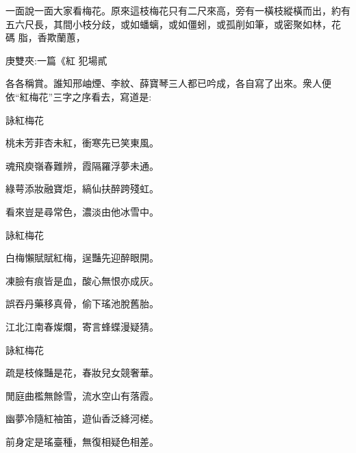 \begin{parag}
    一面說一面大家看梅花。原來這枝梅花只有二尺來高，旁有一橫枝縱橫而出，約有五六尺長，其間小枝分歧，或如蟠螭，或如僵蚓，或孤削如筆，或密聚如林，花 碼 脂，香欺蘭蕙，\begin{note}庚雙夾:一篇《紅 犯場貳\end{note}各各稱賞。誰知邢岫煙、李紋、薛寶琴三人都已吟成，各自寫了出來。衆人便依“紅梅花”三字之序看去，寫道是:
\end{parag}


\begin{poem}
    \begin{pl}詠紅梅花\end{pl}

    \begin{pl}桃未芳菲杏未紅，衝寒先已笑東風。\end{pl}

    \begin{pl}魂飛庾嶺春難辨，霞隔羅浮夢未通。\end{pl}

    \begin{pl}綠萼添妝融寶炬，縞仙扶醉跨殘虹。\end{pl}

    \begin{pl}看來豈是尋常色，濃淡由他冰雪中。\end{pl}
    \emptypl

    \begin{pl}詠紅梅花\end{pl}

    \begin{pl}白梅懶賦賦紅梅，逞豔先迎醉眼開。\end{pl}

    \begin{pl}凍臉有痕皆是血，酸心無恨亦成灰。\end{pl}

    \begin{pl}誤吞丹藥移真骨，偷下瑤池脫舊胎。\end{pl}

    \begin{pl}江北江南春燦爛，寄言蜂蝶漫疑猜。\end{pl}
    \emptypl

    \begin{pl}詠紅梅花\end{pl}

    \begin{pl}疏是枝條豔是花，春妝兒女競奢華。\end{pl}

    \begin{pl}閒庭曲檻無餘雪，流水空山有落霞。\end{pl}

    \begin{pl}幽夢冷隨紅袖笛，遊仙香泛絳河槎。\end{pl}

    \begin{pl}前身定是瑤臺種，無復相疑色相差。\end{pl}
\end{poem}



